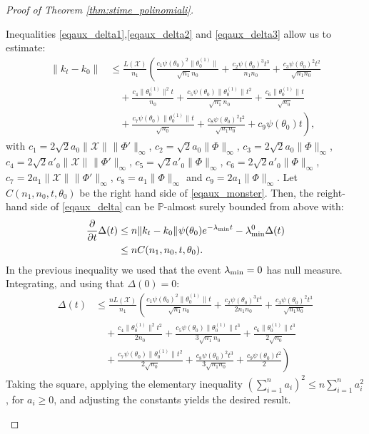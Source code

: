 \documentclass{article}
\theoremstyle{definition}
\theoremstyle{remark}
\numberwithin{equation}{section}
\newcommand{\X}{\mathcal{X}}
\newcommand{\s}{\psi}
\newcommand{\lammin}{\lambda_{\textup{min}}}
\newcommand{\norm}[2]{
    \|#1\|_{#2}
}
\begin{document}
\begin{proof}[Proof of Theorem \ref{thm:stime_polinomiali}]
\begin{itemize}
        Inequalities \eqref{eqaux_delta1},\eqref{eqaux_delta2} and \eqref{eqaux_delta3} allow us to estimate:
        \begin{align}
            \label{eqaux_monster}
            \norm{k_t-k_0}{}&\le \frac{L(\X)}{n_1}\left(\frac{c_1 \s(\theta_0)^2\norm{\theta^{(1)}_0}{}}{\sqrt{n_1}n_0}+\frac{c_2 \s(\theta_0)^3t^3}{n_1n_0}+\frac{c_3 \s(\theta_0)^2t^2}{\sqrt{n_1n_0}} \right.\\
            &\left.\quad +\frac{c_4 \norm{\theta^{(1)}_0}{}^2t}{n_0}+\frac{c_5 \s(\theta_0)\norm{\theta^{(1)}_0}{}t^2}{\sqrt{n_1}n_0}+\frac{c_6 \norm{\theta^{(1)}_0}{}t}{\sqrt{n_0}}\right.\\
            &\left.\quad +\frac{c_7 \s(\theta_0)\norm{\theta^{(1)}_0}{}t}{\sqrt{n_0}}+\frac{c_8 \s(\theta_0)^2t^2}{\sqrt{n_1n_0}}+c_9\s(\theta_0)t\right),
        \end{align}
        with $c_1 = 2\sqrt{2}a_0\norm{\X}{}\norm{\Phi'}{\infty}$,
$c_2 = \sqrt{2}a_0\norm{\Phi}{\infty}$,
$c_3 = 2\sqrt{2}a_0\norm{\Phi}{\infty}$,
$c_4 = 2\sqrt{2}a'_0\norm{\X}{}\norm{\Phi'}{\infty}$,
$c_5 = \sqrt{2}a'_0\norm{\Phi}{\infty}$,
$c_6 = 2\sqrt{2}a'_0\norm{\Phi}{\infty}$,
$c_7 = 2a_1\norm{\X}{}\norm{\Phi'}{\infty}$,
$c_8 = a_1\norm{\Phi}{\infty}$ and $c_9 = 2a_1\norm{\Phi}{\infty}$.
Let $C(n_1,n_0,t,\theta_0)$ be the right hand side of \eqref{eqaux_monster}.
Then, the reight-hand side of \eqref{eqaux_delta} can be $\mathbb P$-almost surely bounded from above with:
\begin{align}
    \frac{\partial}{\partial t} \Delta(t) &\le n\norm{k_t-k_0}{}\s(\theta_0)e^{-\lammin t} -\lammin^0\Delta(t) \\
    &\le nC(n_1,n_0,t,\theta_0).
\end{align}
In the previous inequality we used that the event $\lammin=0$ has null measure.
Integrating, and using that $\Delta(0)=0$:
\begin{align}
    \Delta(t) &\le \frac{nL(\X)}{n_1}\left(\frac{c_1 \s(\theta_0)^2\norm{\theta^{(1)}_0}{}t}{\sqrt{n_1}n_0}+\frac{c_2 \s(\theta_0)^3t^4}{2n_1n_0}+\frac{c_3 \s(\theta_0)^2t^3}{\sqrt{n_1n_0}}\right. \\
    &\left.\quad +\frac{c_4 \norm{\theta^{(1)}_0}{}^2t^2}{2n_0}+\frac{c_5 \s(\theta_0)\norm{\theta^{(1)}_0}{}t^3}{3\sqrt{n_1}n_0}+\frac{c_6 \norm{\theta^{(1)}_0}{}t^3}{2\sqrt{n_0}}\right.\\
    &\left.\quad +\frac{c_7 \s(\theta_0)\norm{\theta^{(1)}_0}{}t^2}{2\sqrt{n_0}}+\frac{c_8 \s(\theta_0)^2t^3}{3\sqrt{n_1n_0}}+\frac{c_9\s(\theta_0)t^2}{2}\right)
\end{align}
Taking the square, applying the elementary inequality $(\sum^n_{i=1}a_i)^2\le n\sum^n_{i=1}a_i^2$, for $a_i\ge 0$,
and adjusting the constants yields the desired result.
    \end{itemize}
\end{proof}
\end{document}
